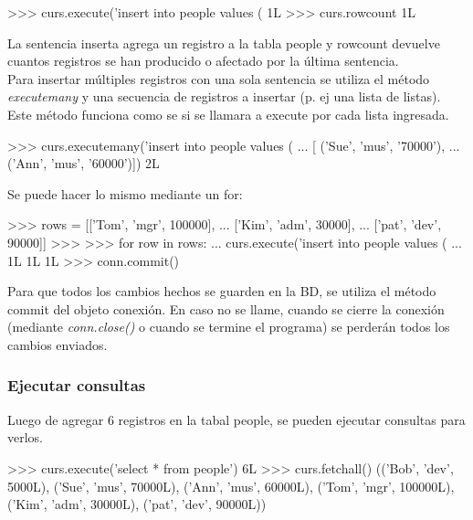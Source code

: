 \begin{pyglist} [language=python]
>>> curs.execute('insert into people values (%
1L
>>> curs.rowcount
1L
\end{pyglist}

La sentencia inserta agrega un registro a la tabla people y rowcount devuelve cuantos registros se han producido o afectado por la última sentencia.\\

Para insertar múltiples registros con una sola sentencia se utiliza el método \textit{executemany} y una secuencia de registros a insertar (p. ej una lista de listas). Este método funciona como se si se llamara a execute por cada lista ingresada.\\

\begin{pyglist} [language=python]
>>> curs.executemany('insert into people values (%
...           [ ('Sue', 'mus', '70000'),
...             ('Ann', 'mus', '60000')])
2L
\end{pyglist}

Se puede hacer lo mismo mediante un for:\\

\begin{pyglist} [language=python]
>>> rows = [['Tom', 'mgr', 100000],
...         ['Kim', 'adm', 30000],
...         ['pat', 'dev', 90000]]
>>> 
>>> for row in rows:
...     curs.execute('insert into people values (%
... 
1L
1L
1L
>>> conn.commit()
\end{pyglist}

Para que todos los cambios hechos se guarden en la BD, se utiliza el método commit del objeto conexión. En caso no se llame, cuando se cierre la conexión (mediante \textit{conn.close()} o cuando se termine el programa) se perderán todos los cambios enviados.\\

\subsubsection{Ejecutar consultas}

Luego de agregar 6 registros en la tabal people, se pueden ejecutar consultas para verlos.\\

\begin{pyglist} [language=python]
>>> curs.execute('select * from people')
6L
>>> curs.fetchall()
(('Bob', 'dev', 5000L), ('Sue', 'mus', 70000L), ('Ann', 'mus', 60000L), 
('Tom', 'mgr', 100000L), ('Kim', 'adm', 30000L), ('pat', 'dev', 90000L))
\end{pyglist}

